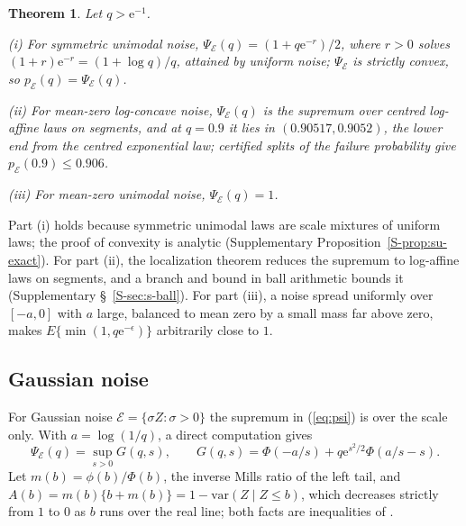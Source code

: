 \documentclass[12pt]{article}
\newtheorem{theorem}{Theorem}
\theoremstyle{definition}
\newcommand{\E}{\mathcal{E}}
\newcommand{\var}{\mathrm{var}}
\begin{document}
\begin{theorem}\label{thm:classes}
Let $q > \mathrm{e}^{-1}$.
\par\noindent (i) For symmetric unimodal noise, $\Psi_{\E}(q) = (1 + q \mathrm{e}^{-r})/2$, where $r > 0$ solves $(1 + r)\mathrm{e}^{-r} = (1 + \log q)/q$, attained by uniform noise; $\Psi_{\E}$ is strictly convex, so $p_{\E}(q) = \Psi_{\E}(q)$.
\par\noindent (ii) For mean-zero log-concave noise, $\Psi_{\E}(q)$ is the supremum over centred log-affine laws on segments, and at $q = 0.9$ it lies in $(0.90517, 0.9052)$, the lower end from the centred exponential law; certified splits of the failure probability give $p_{\E}(0.9) \le 0.906$.
\par\noindent (iii) For mean-zero unimodal noise, $\Psi_{\E}(q) = 1$.
\end{theorem}

Part (i) holds because symmetric unimodal laws are scale mixtures of uniform laws; the proof of convexity is analytic (Supplementary Proposition~\ref{S-prop:su-exact}). For part (ii), the localization theorem \citep{fradelizi2004} reduces the supremum to log-affine laws on segments, and a branch and bound in ball arithmetic bounds it (Supplementary \S~\ref{S-sec:s-ball}). For part (iii), a noise spread uniformly over $[-a, 0]$ with $a$ large, balanced to mean zero by a small mass far above zero, makes $E\{\min(1, q\mathrm{e}^{-\epsilon})\}$ arbitrarily close to $1$.

\subsection{Gaussian noise}

For Gaussian noise $\E = \{\sigma Z : \sigma > 0\}$ the supremum in (\ref{eq:psi}) is over the scale only. With $a = \log(1/q)$, a direct computation gives
\begin{equation}\label{eq:G}
\Psi_{\E}(q) = \sup_{s > 0} G(q, s), \qquad G(q, s) = \Phi(-a/s) + q\mathrm{e}^{s^2/2}\Phi(a/s - s).
\end{equation}
Let $m(b) = \phi(b)/\Phi(b)$, the inverse Mills ratio of the left tail, and $A(b) = m(b)\{b + m(b)\} = 1 - \var(Z \mid Z \le b)$, which decreases strictly from $1$ to $0$ as $b$ runs over the real line; both facts are inequalities of \citet{sampford1953}.
\end{document}
